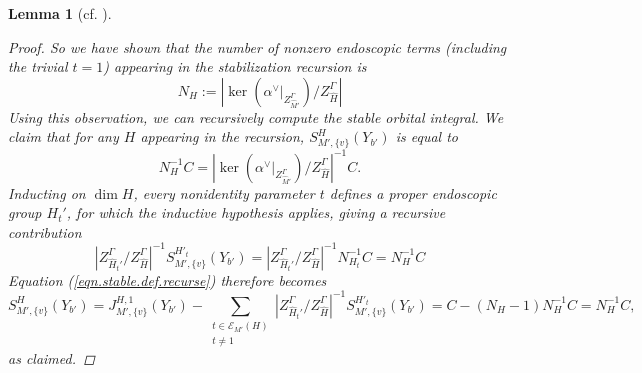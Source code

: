 \documentclass[openany]{amsbook}
\newtheorem{lemma}[theorem]{Lemma}
\theoremstyle{definition}
\theoremstyle{remark}
\numberwithin{equation}{section}
\newcommand{\cE}{\mathcal{E}}
\renewcommand{\-}{\operatorname{-}}
\renewcommand{\t}{\mathfrak{t}}
\begin{document}
\begin{lemma}[{cf. \cite[Lemme 17.6.2, Lemme 17.8.1]{CLII}}]
\begin{proof}
        So we have shown that the number of nonzero endoscopic terms (including the trivial $t = 1$) appearing in the stabilization recursion is
        $$
            N_H := \left|\ker\left(\alpha^\vee|_{Z_{\widehat{M}'}^\Gamma}\right)/Z_{\widehat{H}}^{\Gamma}\right|
        $$
        Using this observation, we can recursively compute the stable orbital integral. We claim that for any $H$ appearing in the recursion, $S^H_{M', \{v\}}(Y_{b'})$ is equal to
        \begin{equation}
            N_H^{-1} C = \left|\ker\left(\alpha^\vee|_{Z_{\widehat{M}'}^\Gamma}\right)/Z_{\widehat{H}}^{\Gamma}\right|^{-1} C.\label{eqn.stab.rk1.recurs.formula}
        \end{equation}
        Inducting on $\dim H$, every nonidentity parameter $t$ defines a proper endoscopic group $H_t'$, for which the inductive hypothesis applies, giving a recursive contribution
        $$
            \left| Z_{\widehat{H}_t'}^{\Gamma}/Z_{\widehat{H}}^\Gamma\right|^{-1} S^{H'_t}_{M',\{v\}}(Y_{b'}) = \left| Z_{\widehat{H}_t'}^{\Gamma}/Z_{\widehat{H}}^\Gamma\right|^{-1} N_{H_t}^{-1} C = N_H^{-1} C
        $$
        Equation (\ref{eqn.stable.def.recurse}) therefore becomes
        $$
            S^H_{M', \{v\}}(Y_{b'}) = J^{H, 1}_{M', \{v\}}(Y_{b'}) - \sum_{\substack{t \in \cE_{M'}(H)\\t \neq 1}} \left| Z_{\widehat{H}_t'}^{\Gamma}/Z_{\widehat{H}}^\Gamma\right|^{-1} S^{H'_t}_{M',\{v\}}(Y_{b'}) = C - \left(N_H - 1\right) N_H^{-1} C = N_H^{-1} C,
        $$
        as claimed. 


\end{proof}
\end{lemma}
\end{document}
